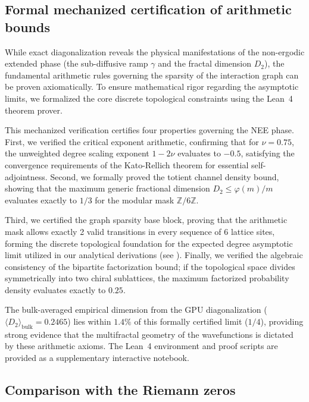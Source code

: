 \documentclass[11pt,a4paper]{article}
\begin{document}
\subsection{Formal mechanized certification of arithmetic bounds}
\label{sec:formal_verification}

While exact diagonalization reveals the physical manifestations of the non-ergodic extended phase (the sub-diffusive ramp $\gamma$ and the fractal dimension $D_2$), the fundamental arithmetic rules governing the sparsity of the interaction graph can be proven axiomatically. To ensure mathematical rigor regarding the asymptotic limits, we formalized the core discrete topological constraints using the Lean~4 theorem prover.

This mechanized verification certifies four properties governing the NEE phase. First, we verified the critical exponent arithmetic, confirming that for $\nu=0.75$, the unweighted degree scaling exponent $1-2\nu$ evaluates to $-0.5$, satisfying the convergence requirements of the Kato-Rellich theorem for essential self-adjointness. Second, we formally proved the totient channel density bound, showing that the maximum generic fractional dimension $D_2 \le \varphi(m)/m$ evaluates exactly to $1/3$ for the modular mask $\mathbb{Z}/6\mathbb{Z}$.

Third, we certified the graph sparsity base block, proving that the arithmetic mask allows exactly 2 valid transitions in every sequence of 6 lattice sites, forming the discrete topological foundation for the expected degree asymptotic limit utilized in our analytical derivations (see ). Finally, we verified the algebraic consistency of the bipartite factorization bound; if the topological space divides symmetrically into two chiral sublattices, the maximum factorized probability density evaluates exactly to $0.25$.

The bulk-averaged empirical dimension from the GPU diagonalization ($\langle D_2 \rangle_{\text{bulk}} = 0.2465$) lies within $1.4\%$ of this formally certified limit ($1/4$), providing strong evidence that the multifractal geometry of the wavefunctions is dictated by these arithmetic axioms. The Lean~4 environment and proof scripts are provided as a supplementary interactive notebook.

\subsection{Comparison with the Riemann zeros}
\end{document}
